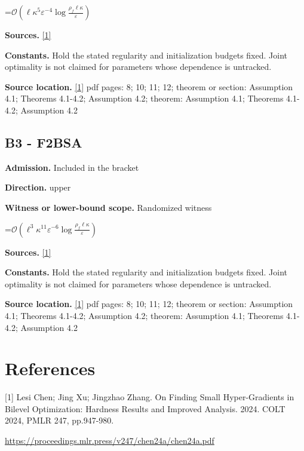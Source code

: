 \documentclass[10pt,a4paper]{article}
\newcommand{\AtlasMath}[1]{\par\begingroup\centering\setbox0=\hbox{$\displaystyle #1$}\ifdim\wd0>1.4\linewidth\typeout{ATLAS WIDE FORMULA: \the\wd0}\fi\ifdim\wd0>\linewidth\resizebox{\linewidth}{!}{\box0}\else\box0\fi\par\endgroup}
\begin{document}
\AtlasMath{\mathcal{O}\!\left(\ell\kappa^5\varepsilon^{-4}\log\frac{\rho_f\ell\kappa}{\varepsilon}\right)}
\textbf{Sources.} \href{https://proceedings.mlr.press/v247/chen24a/chen24a.pdf}{[1]}

\textbf{Constants.} Hold the stated regularity and initialization budgets fixed. Joint optimality is not claimed for parameters whose dependence is untracked.

\textbf{Source location.} \href{https://proceedings.mlr.press/v247/chen24a/chen24a.pdf}{[1]} pdf pages: 8; 10; 11; 12; theorem or section: Assumption 4.1; Theorems 4.1-4.2; Assumption 4.2; theorem: Assumption 4.1; Theorems 4.1-4.2; Assumption 4.2

\subsection{B3 - F2BSA}
\textbf{Admission.} Included in the bracket

\textbf{Direction.} upper

\textbf{Witness or lower-bound scope.} Randomized witness

\AtlasMath{\mathcal{O}\!\left(\ell^3\kappa^{11}\varepsilon^{-6}\log\frac{\rho_f\ell\kappa}{\varepsilon}\right)}
\textbf{Sources.} \href{https://proceedings.mlr.press/v247/chen24a/chen24a.pdf}{[1]}

\textbf{Constants.} Hold the stated regularity and initialization budgets fixed. Joint optimality is not claimed for parameters whose dependence is untracked.

\textbf{Source location.} \href{https://proceedings.mlr.press/v247/chen24a/chen24a.pdf}{[1]} pdf pages: 8; 10; 11; 12; theorem or section: Assumption 4.1; Theorems 4.1-4.2; Assumption 4.2; theorem: Assumption 4.1; Theorems 4.1-4.2; Assumption 4.2

\section{References}
[1] Lesi Chen; Jing Xu; Jingzhao Zhang. On Finding Small Hyper-Gradients in Bilevel Optimization: Hardness Results and Improved Analysis. 2024. COLT 2024, PMLR 247, pp.947-980.

\url{https://proceedings.mlr.press/v247/chen24a/chen24a.pdf}
\end{document}
